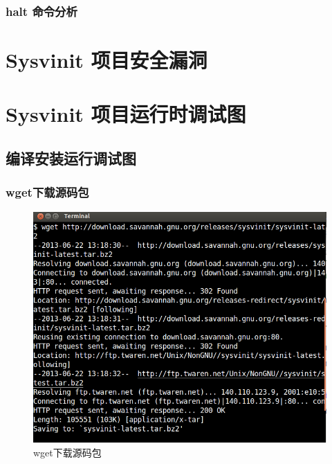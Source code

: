 \subsection{halt 命令分析}

\chapter{Sysvinit 项目安全漏洞}

\chapter{Sysvinit 项目运行时调试图}

\section{编译安装运行调试图}

\subsection{wget下载源码包}

\begin{figure}[htbp]
\centering
\includegraphics{./pictures/1-1-wget.png}
\caption{wget下载源码包}
\end{figure}

